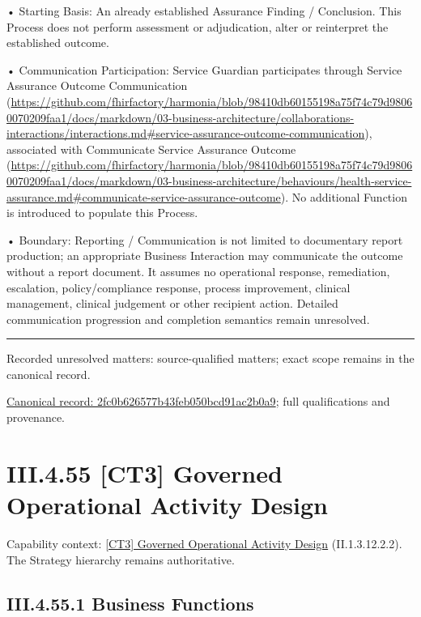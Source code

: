 •
Starting Basis: An already established Assurance Finding / Conclusion. This Process does not perform assessment or adjudication, alter or reinterpret the established outcome.



•
Communication Participation: Service Guardian participates through Service Assurance Outcome Communication (\url{https://github.com/fhirfactory/harmonia/blob/98410db60155198a75f74c79d98060070209faa1/docs/markdown/03-business-architecture/collaborations-interactions/interactions.md#service-assurance-outcome-communication}), associated with Communicate Service Assurance Outcome (\url{https://github.com/fhirfactory/harmonia/blob/98410db60155198a75f74c79d98060070209faa1/docs/markdown/03-business-architecture/behaviours/health-service-assurance.md#communicate-service-assurance-outcome}). No additional Function is introduced to populate this Process.



•
Boundary: Reporting / Communication is not limited to documentary report production; an appropriate Business Interaction may communicate the outcome without a report document. It assumes no operational response, remediation, escalation, policy/compliance response, process improvement, clinical management, clinical judgement or other recipient action. Detailed communication progression and completion semantics remain unresolved.



\medskip\hrule\medskip

{\small Recorded unresolved matters: source-qualified matters; exact scope remains in the canonical record.}\par
{\footnotesize \href{../../../../continuum/business/business-process/2fc0b626577b43feb050bcd91ac2b0a9.md}{Canonical record: 2fc0b626577b43feb050bcd91ac2b0a9}; full qualifications and provenance.}\par
\section*{III.4.55 [CT3] Governed Operational Activity Design}
\label{navigation:III.4.55}

{\small Capability context: \hyperref[element:3a96040821c14fe38830411dab4f8453]{[CT3] Governed Operational Activity Design} (II.1.3.12.2.2). The Strategy hierarchy remains authoritative.}\par
\subsection*{III.4.55.1 Business Functions}
\label{navigation:III.4.55.1}


